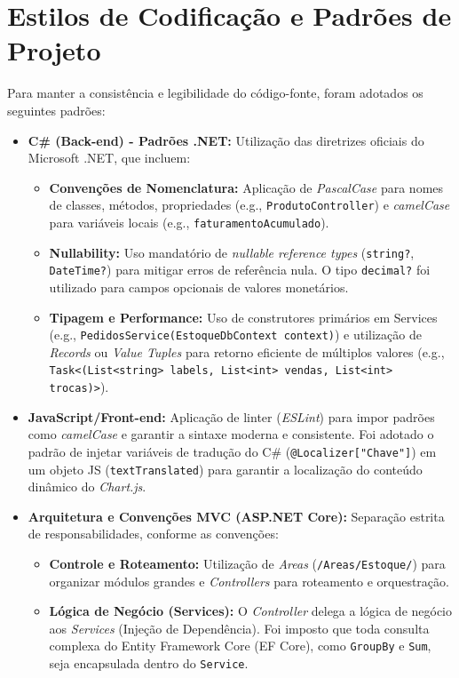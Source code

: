 \documentclass[
	12pt,				%
	openany,			%
	twoside,			%
	a4paper,			%
	english,			%
	brazil				%
	]{abntex2}
\begin{document}
\section{Estilos de Codificação e Padrões de Projeto}
Para manter a consistência e legibilidade do código-fonte, foram adotados os seguintes padrões:

\begin{itemize}
    \item \textbf{C\# (Back-end) - Padrões .NET:} Utilização das diretrizes oficiais do Microsoft .NET, que incluem:
    \begin{itemize}
        \item \textbf{Convenções de Nomenclatura:} Aplicação de \textit{PascalCase} para nomes de classes, métodos, propriedades (e.g., \texttt{ProdutoController}) e \textit{camelCase} para variáveis locais (e.g., \texttt{faturamentoAcumulado}).
        \item \textbf{Nullability:} Uso mandatório de \textit{nullable reference types} (\texttt{string?}, \texttt{DateTime?}) para mitigar erros de referência nula. O tipo \texttt{decimal?} foi utilizado para campos opcionais de valores monetários.
        \item \textbf{Tipagem e Performance:} Uso de construtores primários em Services (e.g., \texttt{PedidosService(EstoqueDbContext context)}) e utilização de \textit{Records} ou \textit{Value Tuples} para retorno eficiente de múltiplos valores (e.g., \texttt{Task<(List<string> labels, List<int> vendas, List<int> trocas)>}).
    \end{itemize}

    \item \textbf{JavaScript/Front-end:} Aplicação de linter (\textit{ESLint}) para impor padrões como \textit{camelCase} e garantir a sintaxe moderna e consistente. Foi adotado o padrão de injetar variáveis de tradução do C\# (\texttt{@Localizer["Chave"]}) em um objeto JS (\texttt{textTranslated}) para garantir a localização do conteúdo dinâmico do \textit{Chart.js}.

    \item \textbf{Arquitetura e Convenções MVC (ASP.NET Core):} Separação estrita de responsabilidades, conforme as convenções:
    \begin{itemize}
        \item \textbf{Controle e Roteamento:} Utilização de \textit{Areas} (\texttt{/Areas/Estoque/}) para organizar módulos grandes e \textit{Controllers} para roteamento e orquestração.
        \item \textbf{Lógica de Negócio (Services):} O \textit{Controller} delega a lógica de negócio aos \textit{Services} (Injeção de Dependência). Foi imposto que toda consulta complexa do Entity Framework Core (EF Core), como \texttt{GroupBy} e \texttt{Sum}, seja encapsulada dentro do \texttt{Service}.
 
    \end{itemize}
\end{itemize}
\end{document}
